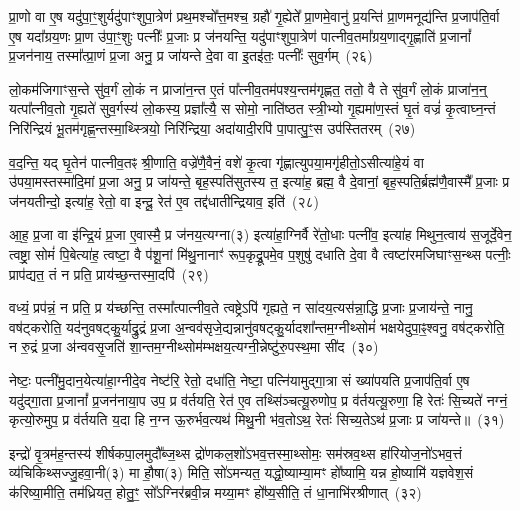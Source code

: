 प्रा॒णो वा ए॒ष यदु॑पा॒ꣳ॒शुर्यदु॑पाꣳशुपा॒त्रेण॑ प्रथ॒मश्चो᳚त्त॒मश्च॒ ग्रहौ॑ गृ॒ह्येते᳚ प्रा॒णमे॒वानु॑ प्र॒यन्ति॑ प्रा॒णमनूद्य॑न्ति प्र॒जा\-प॑ति॒र्वा ए॒ष यदा᳚ग्रय॒णः प्रा॒ण उ॑पा॒ꣳ॒शुः पत्नीः᳚ प्र॒जाः प्र ज॑नयन्ति॒ यदु॑पाꣳशुपा॒त्रेण॑ पात्नीव॒तमा᳚ग्रय॒णाद्गृ॒ह्णाति॑ प्र॒जानां᳚ प्र॒जन॑नाय॒ तस्मा᳚त्प्रा॒णं प्र॒जा अनु॒ प्र जा॑यन्ते दे॒वा वा इ॒तइ॑तः॒ पत्नीः᳚ सुव॒र्गम्~(२६)\ip

लो॒कम॑जिगाꣳस॒न्ते सु॑व॒र्गं लो॒कं न प्राजा॑न॒न्त ए॒तं पा᳚त्नीव॒तम॑पश्य॒न्तम॑गृह्णत॒ ततो॒ वै ते सु॑व॒र्गं लो॒कं प्राजा॑न॒न्॒ यत्पा᳚त्नीव॒तो गृ॒ह्यते॑ सुव॒र्गस्य॑ लो॒कस्य॒ प्रज्ञा᳚त्यै॒ स सोमो॒ नाति॑ष्ठत स्त्री॒भ्यो गृ॒ह्यमा॑ण॒स्तं घृ॒तं वज्रं॑ कृ॒त्वाघ्न॒न्तं निरि॑न्द्रियं भू॒तम॑गृह्ण॒न्तस्मा॒थ्स्त्रियो॒ निरि॑न्द्रिया॒ अदा॑यादी॒रपि॑ पा॒पात्पु॒ꣳ॒स उप॑स्तितरम्~(२७)\ip

व॒द॒न्ति॒ यद् घृ॒तेन॑ पात्नीव॒तꣴ श्री॒णाति॒ वज्रे॑णै॒वैनं॒ वशे॑ कृ॒त्वा गृ॑ह्णात्युपया॒मगृ॑हीतो॒\-ऽसीत्या॑हे॒यं वा उ॑पया॒मस्तस्मा॑दि॒मां प्र॒जा अनु॒ प्र जा॑यन्ते॒ बृह॒स्पति॑सुतस्य त॒ इत्या॑ह॒ ब्रह्म॒ वै दे॒वानां॒ बृह॒स्पति॒र्ब्रह्म॑णै॒वास्मै᳚ प्र॒जाः प्र ज॑नयतीन्दो॒ इत्या॑ह॒ रेतो॒ वा इन्दू॒ रेत॑ ए॒व तद्द॑धातीन्द्रियाव॒ इति॑~(२८)\ip

आ॒ह॒ प्र॒जा वा इ॑न्द्रि॒यं प्र॒जा ए॒वास्मै॒ प्र ज॑नय॒त्यग्ना(३) इत्या॑हा॒ग्निर्वै रे॑तो॒धाः पत्नी॑व॒ इत्या॑ह मिथुन॒त्वाय॑ स॒जूर्दे॒वेन॒ त्वष्ट्रा॒ सोमं॑ पि॒बेत्या॑ह॒ त्वष्टा॒ वै प॑शू॒नां मि॑थु॒नानाꣳ॑ रूप॒कृद्रू॒पमे॒व प॒शुषु॑ दधाति दे॒वा वै त्वष्टा॑रमजिघाꣳस॒न्थ्स पत्नीः॒ प्राप॑द्यत॒ तं न प्रति॒ प्राय॑च्छ॒न्तस्मा॒दपि॑~(२९)\ip

वध्यं॒ प्रप॑न्नं॒ न प्रति॒ प्र य॑च्छन्ति॒ तस्मा᳚त्पात्नीव॒ते त्वष्ट्रे\-ऽपि॑ गृह्यते॒ न सा॑दय॒त्यस॑न्ना॒द्धि प्र॒जाः प्र॒जाय॑न्ते॒ नानु॒ वष॑ट्करोति॒ यद॑नुवषट्कु॒र्याद्रु॒द्रं प्र॒जा अ॒न्वव॑सृजे॒द्यन्नानु॑वषट्कु॒र्यादशा᳚न्तम॒ग्नीथ्सोमं॑ भक्षयेदुपा॒ꣴ॒श्वनु॒ वष॑ट्करोति॒ न रु॒द्रं प्र॒जा अ॑न्ववसृ॒जति॑ शा॒न्तम॒ग्नीथ्सोम॑म्भक्षय॒त्यग्नी॒न्नेष्टु॑रु॒पस्थ॒मा सी॑द~(३०)\ip

नेष्टः॒ पत्नी॑मु॒दान॒येत्या॑हा॒ग्नीदे॒व नेष्ट॑रि॒ रेतो॒ दधा॑ति॒ नेष्टा॒ पत्नि॑यामुद्गा॒त्रा सं ख्या॑पयति प्र॒जा\-प॑ति॒र्वा ए॒ष यदु॑द्गा॒ता प्र॒जानां᳚ प्र॒जन॑नाया॒प उप॒ प्र व॑र्तयति॒ रेत॑ ए॒व तथ्सि॑ञ्चत्यू॒रुणोप॒ प्र व॑र्तयत्यू॒रुणा॒ हि रेतः॑ सि॒च्यते॑ नग्नं॒ कृत्यो॒रुमुप॒ प्र व॑र्तयति य॒दा हि न॒ग्न ऊ॒रुर्भव॒त्यथ॑ मिथु॒नी भ॑व॒तो\-ऽथ॒ रेतः॑ सिच्य॒ते\-ऽथ॑ प्र॒जाः प्र जा॑यन्ते॥~(३१)\ip

{\anuvakamend[{पत्नीः᳚ सुव॒र्गमुप॑स्तितरमिन्द्रियाव॒ इत्यपि॑ सीद मिथु॒न्य॑ष्टौ च॑}]}

इन्द्रो॑ वृ॒त्रम॑ह॒न्तस्य॑ शीर्\mbox{}षकपा॒लमुदौ᳚ब्ज॒थ्स द्रो॑णकल॒शो॑\-ऽभव॒त्तस्मा॒थ्सोमः॒ सम॑स्रव॒थ्स हा॑रियोज॒नो॑\-ऽभव॒त्तं व्य॑चिकिथ्सज्जु॒हवा॒नी(३) मा हौ॒षा(३) मिति॒ सो॑\-ऽमन्यत॒ यद्धो॒ष्याम्या॒मꣳ हो᳚ष्यामि॒ यन्न हो॒ष्यामि॑ यज्ञवेश॒सं क॑रिष्या॒मीति॒ तम॑ध्रियत॒ होतु॒ꣳ॒ सो᳚\-ऽग्निर॑ब्रवी॒न्न मय्या॒मꣳ हो᳚ष्य॒सीति॒ तं धा॒नाभि॑रश्रीणात्~(३२)\ip

